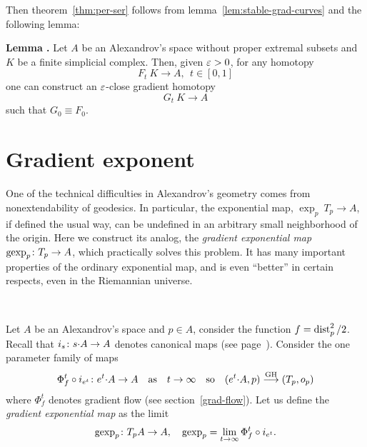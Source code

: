 \documentclass{article}
\begin{document}
Then theorem~\ref{thm:per-ser} follows from lemma~\ref{lem:stable-grad-curves} and the following lemma:

\begin{thm}{\bf Lemma \cite{petrunin:grad-hom}.}\label{lem:hom-approx} Let $A$ be an Alexandrov's space without proper extremal subsets and $K$ be a finite simplicial complex. 
Then, given $\varepsilon>0$, for any  homotopy 
$$F_t\:K\to A,\ \ t\in [0,1]$$ one can construct an $\varepsilon$-close gradient homotopy 
$$G_t\:K\to A$$ such that $G_0\equiv F_0$.
\end{thm}















\section{Gradient exponent}\label{gexp}

\addtocounter{subsection}{1}
\setcounter{thm}{0}

One of the technical difficulties in Alexandrov's geometry comes from
nonextendability of geodesics. 
In particular, the exponential map, $\exp_p\:T_p\to A$, if defined the usual way, can
be undefined in an arbitrary small neighborhood of the origin. 
Here we construct its analog, the \emph{gradient exponential map} $\operatorname{gexp}_p\colon T_p\to
A$, which practically solves this problem. 
It has many important properties of the ordinary exponential map, and is even
``better'' in certain respects,
even in the Riemannian universe.

\ 

Let $A$ be an Alexandrov's space and $p\in A$, consider the function $f\z=\dist_p^2/2$.
Recall that $i_{s}\colon s{\cdot} A\to A$ denotes canonical maps (see
page~\pageref{tangent-def2}). 
Consider the one parameter family of maps
$$\Phi^t_{f}\circ i_{e^t}\:e^t{\cdot} A\to A\ \ \ \text{as}\ \ \ t\to\infty \ \ \
\text{so}\ \ \ (e^t{\cdot} A,p)\GHto (T_p,o_p)$$
where $\Phi^t_{f}$ denotes gradient flow (see section~\ref{grad-flow}). 
Let us define the \textit{gradient exponential map} as the limit
$$\gexp_p\:T_p A\to A,\ \ \  \gexp_p=\lim_{t\to\infty}\Phi^t_{f}\circ i_{e^t}.$$
\end{document}
